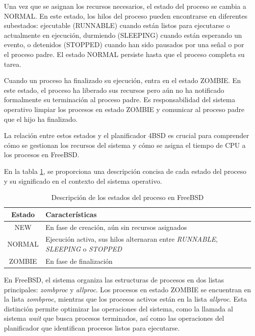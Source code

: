 Una vez que se asignan los recursos necesarios, el estado del proceso se cambia a NORMAL. En este estado, los hilos del proceso pueden encontrarse en diferentes subestados: ejecutable (RUNNABLE) cuando están listos para ejecutarse o actualmente en ejecución, durmiendo (SLEEPING) cuando están esperando un evento, o detenidos (STOPPED) cuando han sido pausados por una señal o por el proceso padre. El estado NORMAL persiste hasta que el proceso completa su tarea.

Cuando un proceso ha finalizado su ejecución, entra en el estado ZOMBIE. En este estado, el proceso ha liberado sus recursos pero aún no ha notificado formalmente su terminación al proceso padre. Es responsabilidad del sistema operativo limpiar los procesos en estado ZOMBIE y comunicar al proceso padre que el hijo ha finalizado.

La relación entre estos estados y el planificador 4BSD es crucial para comprender cómo se gestionan los recursos del sistema y cómo se asigna el tiempo de CPU a los procesos en FreeBSD.

En la tabla \ref{tabla:estados-proceso}, se proporciona una descripción concisa de cada estado del proceso y su significado en el contexto del sistema operativo.

\begin{table}[H]
    \centering
    \begin{tabular}{|c|p{}|}
        \hline
        \textbf{Estado} & \textbf{Características}                                                                             \\
        \hline
        NEW             & En fase de creación, aún sin recursos asignados                                                      \\
        \hline
        NORMAL          & Ejecución activa, sus hilos alternaran entre \textit{RUNNABLE}, \textit{SLEEPING} o \textit{STOPPED} \\
        \hline
        ZOMBIE          & En fase de finalización                                                                              \\
        \hline
    \end{tabular}
    \caption{Descripción de los estados del proceso en FreeBSD}
    \label{tabla:estados-proceso}
\end{table}

En FreeBSD, el sistema organiza las estructuras de procesos en dos listas principales: \textit{zombproc} y \textit{allproc}. Los procesos en estado ZOMBIE se encuentran en la lista \textit{zombproc}, mientras que los procesos activos están en la lista \textit{allproc}. Esta distinción permite optimizar las operaciones del sistema, como la llamada al sistema \textit{wait} que busca procesos terminados, así como las operaciones del planificador que identifican procesos listos para ejecutarse.

